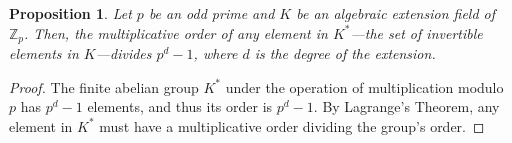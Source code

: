 \documentclass[12pt, a4paper, reqno]{amsart}
\newtheorem{prop}{Proposition}
\newcommand\divides{\ | \ }
\begin{document}
	\begin{prop}
		\label{prop:extensionOrder}
		Let $p$ be an odd prime and $K$ be an algebraic extension field of $\mathds{Z}_p$. Then, the multiplicative order of any element in $K^*$---the set of invertible 
		elements in $K$---divides $p^d - 1$, where $d$ is the degree of the extension.
	\end{prop}
	\begin{proof}
		The finite abelian group $K^*$ under the operation of multiplication modulo $p$ has $p^d - 1$ elements, and thus its order is $p^d - 1$. By Lagrange's Theorem, 
		any element in $K^*$ must have a multiplicative order dividing the group's order. %
	\end{proof}
	\begin{comment}
	\begin{proof}
		Let $A \in \mathds{Z}_{p}^{d \times d}$ be an invertible matrix whose minimal polynomial is $f(x)$. Such matrices can always be created by finding the companion 
		matrix to $f(x)$ and performing a change of basis on it using an arbitrary matrix whose determinant is one. Note that $A$ will satisfy the same algebraic properties
		as $\alpha$, mainly that $f(A) \equiv 0 \bmod{p}$. Therefore, the multiplicative order of $A$ will be equal to the multiplicative order of $\alpha$. (CAN I JUSTIFY 
		THIS MORE FORMALLY?)
		
		Since the minimal polynomial of $A$ is irreducible, the minimal annihilating polynomial under $A$ for all nonzero vectors $\vec{v} \in \mathds{Z}_p^d$ 
		is $f(x)$ (since the minimal annihilating polynomial under $A$ for any vector in a vector space must divide the minimal polynomial of $A$). By the Minimal 
		Polynomial Theorem (via \citet{Patterson2008}), this means every nonzero vector in $\mathds{Z}_p^d$ has the same multiplicative order. Let $r$ be this 
		multiplicative order. There are $p^d - 1$ nonzero vectors in $\mathds{Z}_p^d$, and so for all nonzero vectors to have the same multiplicative order under an 
		invertible matrix, $r \divides p^d - 1$.
		
		As well, since $A^{r}\vec{v} \equiv \vec{v} \bmod{p}$ for all vectors $\vec{v} \in \mathds{Z}_p^d$, this means $A^r \equiv I \bmod{p}$ since the identity is the
		only matrix with this property. Thus, the multiplicative order of $A$ is $r$, and so the multiplicative order of $\alpha$ is also $r$. Therefore, the multiplicative
		order of $\alpha$ divides $p^d - 1$.
	\end{proof}
	\end{comment}
	
\end{document}
